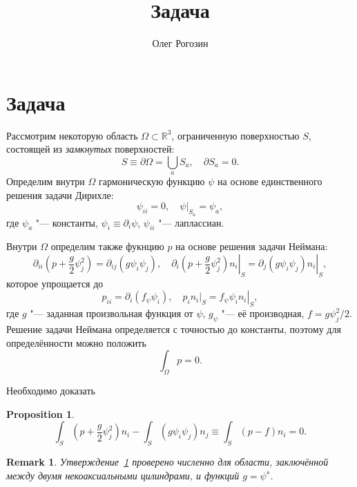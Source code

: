 \documentclass{article}
\title{Задача}
\author{Олег Рогозин}
\newtheorem{proposition}{Proposition}
\newtheorem{remark}{Remark}
\begin{document}
\section{Задача}

Рассмотрим некоторую область \(\Omega\subset\mathbb{R}^3\), ограниченную поверхностью \(S\),
состоящей из \emph{замкнутых} поверхностей:
\begin{equation}\label{eq:domain_boundary}
    S \equiv \partial\Omega = \bigcup_a S_a, \quad \partial{S_a} = 0.
\end{equation}
Определим внутри \(\Omega\) гармоническую функцию \(\psi\) на основе единственного решения задачи Дирихле:
\begin{equation}\label{eq:psi_Dirichlet}
    \psi_{ii} = 0, \quad \psi|_{S_a} = \psi_a,
\end{equation}
где \(\psi_a\) "--- константы, \(\psi_i\equiv\partial_i\psi\), \(\psi_{ii}\) "--- лаплассиан.

Внутри \(\Omega\) определим также фукнцию \(p\) на основе решения задачи Неймана:
\begin{equation}\label{eq:p_Neumann}
    \partial_{ii}\left( p + \frac{g}2\psi_j^2 \right) = \partial_{ij}\left( g\psi_i\psi_j \right), \quad
    \left.\partial_i\left( p + \frac{g}2\psi_j^2 \right)n_i\right|_S =
    \left.\partial_j\left( g\psi_i\psi_j \right)n_i\right|_S,
\end{equation}
которое упрощается до
\begin{equation}\label{eq:p_Neumann2}
    p_{ii} = \partial_i\left( f_\psi \psi_i \right), \quad
    p_i n_i|_S = \left. f_\psi \psi_i n_i \right|_S,
\end{equation}
где \(g\) "--- заданная произвольная функция от \(\psi\), \(g_\psi\) "--- её производная, \(f=g\psi_j^2/2\).
Решение задачи Неймана определяется с точностью до константы, поэтому для определённости можно положить
\begin{equation}\label{eq:p_over_domain}
    \int_\Omega p = 0.
\end{equation}

Необходимо доказать
\begin{proposition}\label{prop:main}
\begin{equation}\label{eq:forces_sum}
    \int_S\left( p + \frac{g}2\psi_j^2\right)n_i - \int_S\left( g\psi_i\psi_j \right)n_j \equiv
    \int_S\left( p - f \right)n_i = 0.
\end{equation}
\end{proposition}

\begin{remark}
    Утверждение~\ref{prop:main} проверено численно для области, заключённой между двумя некоаксиальными цилиндрами,
    и функций \(g=\psi^s\).
\end{remark}
\end{document}
